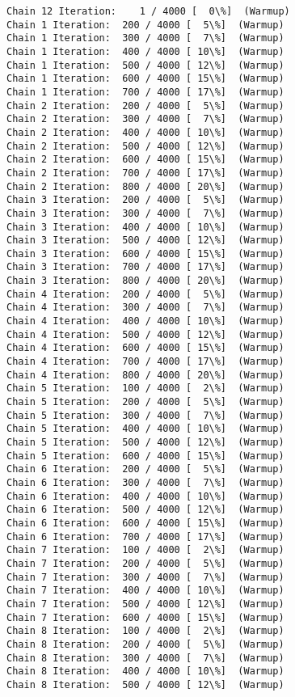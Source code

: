 \documentclass[11pt]{article}
\begin{document}
    \begin{Verbatim}[commandchars=\\\{\}]
Chain 12 Iteration:    1 / 4000 [  0\%]  (Warmup)
Chain 1 Iteration:  200 / 4000 [  5\%]  (Warmup)
Chain 1 Iteration:  300 / 4000 [  7\%]  (Warmup)
Chain 1 Iteration:  400 / 4000 [ 10\%]  (Warmup)
Chain 1 Iteration:  500 / 4000 [ 12\%]  (Warmup)
Chain 1 Iteration:  600 / 4000 [ 15\%]  (Warmup)
Chain 1 Iteration:  700 / 4000 [ 17\%]  (Warmup)
Chain 2 Iteration:  200 / 4000 [  5\%]  (Warmup)
Chain 2 Iteration:  300 / 4000 [  7\%]  (Warmup)
Chain 2 Iteration:  400 / 4000 [ 10\%]  (Warmup)
Chain 2 Iteration:  500 / 4000 [ 12\%]  (Warmup)
Chain 2 Iteration:  600 / 4000 [ 15\%]  (Warmup)
Chain 2 Iteration:  700 / 4000 [ 17\%]  (Warmup)
Chain 2 Iteration:  800 / 4000 [ 20\%]  (Warmup)
Chain 3 Iteration:  200 / 4000 [  5\%]  (Warmup)
Chain 3 Iteration:  300 / 4000 [  7\%]  (Warmup)
Chain 3 Iteration:  400 / 4000 [ 10\%]  (Warmup)
Chain 3 Iteration:  500 / 4000 [ 12\%]  (Warmup)
Chain 3 Iteration:  600 / 4000 [ 15\%]  (Warmup)
Chain 3 Iteration:  700 / 4000 [ 17\%]  (Warmup)
Chain 3 Iteration:  800 / 4000 [ 20\%]  (Warmup)
Chain 4 Iteration:  200 / 4000 [  5\%]  (Warmup)
Chain 4 Iteration:  300 / 4000 [  7\%]  (Warmup)
Chain 4 Iteration:  400 / 4000 [ 10\%]  (Warmup)
Chain 4 Iteration:  500 / 4000 [ 12\%]  (Warmup)
Chain 4 Iteration:  600 / 4000 [ 15\%]  (Warmup)
Chain 4 Iteration:  700 / 4000 [ 17\%]  (Warmup)
Chain 4 Iteration:  800 / 4000 [ 20\%]  (Warmup)
Chain 5 Iteration:  100 / 4000 [  2\%]  (Warmup)
Chain 5 Iteration:  200 / 4000 [  5\%]  (Warmup)
Chain 5 Iteration:  300 / 4000 [  7\%]  (Warmup)
Chain 5 Iteration:  400 / 4000 [ 10\%]  (Warmup)
Chain 5 Iteration:  500 / 4000 [ 12\%]  (Warmup)
Chain 5 Iteration:  600 / 4000 [ 15\%]  (Warmup)
Chain 6 Iteration:  200 / 4000 [  5\%]  (Warmup)
Chain 6 Iteration:  300 / 4000 [  7\%]  (Warmup)
Chain 6 Iteration:  400 / 4000 [ 10\%]  (Warmup)
Chain 6 Iteration:  500 / 4000 [ 12\%]  (Warmup)
Chain 6 Iteration:  600 / 4000 [ 15\%]  (Warmup)
Chain 6 Iteration:  700 / 4000 [ 17\%]  (Warmup)
Chain 7 Iteration:  100 / 4000 [  2\%]  (Warmup)
Chain 7 Iteration:  200 / 4000 [  5\%]  (Warmup)
Chain 7 Iteration:  300 / 4000 [  7\%]  (Warmup)
Chain 7 Iteration:  400 / 4000 [ 10\%]  (Warmup)
Chain 7 Iteration:  500 / 4000 [ 12\%]  (Warmup)
Chain 7 Iteration:  600 / 4000 [ 15\%]  (Warmup)
Chain 8 Iteration:  100 / 4000 [  2\%]  (Warmup)
Chain 8 Iteration:  200 / 4000 [  5\%]  (Warmup)
Chain 8 Iteration:  300 / 4000 [  7\%]  (Warmup)
Chain 8 Iteration:  400 / 4000 [ 10\%]  (Warmup)
Chain 8 Iteration:  500 / 4000 [ 12\%]  (Warmup)

\end{Verbatim}
\end{document}
